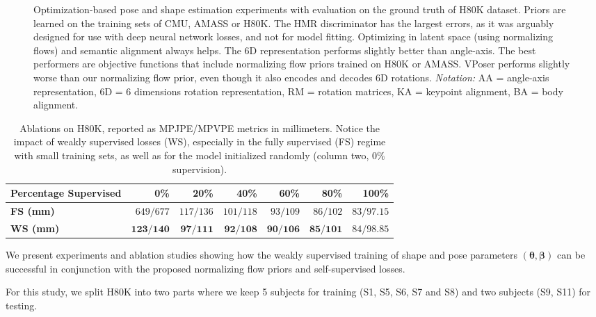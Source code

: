 \documentclass[runningheads]{llncs}
\newcommand{\thetab}{\bm{\theta}}
\newcommand{\betab}{\bm{\beta}}
\begin{document}
\begin{figure}
{\begin{tabular}[t]{|l|r|r|}
    \hline
    \end{tabular}
}
{
\caption{\small Optimization-based pose and shape estimation experiments with evaluation on the ground truth of H80K dataset. Priors are learned on the training sets of CMU, AMASS or H80K. The HMR discriminator has the largest errors, as it was arguably designed for use with deep neural network losses, and not for model fitting. Optimizing in latent space (using normalizing flows) and semantic alignment always helps. The 6D representation performs slightly better than angle-axis. The best performers are objective functions that include normalizing flow priors trained on H80K or AMASS. VPoser performs slightly worse than our normalizing flow prior, even though it also encodes and decodes 6D rotations. \textit{Notation:} AA = angle-axis representation, 6D = 6 dimensions rotation representation, RM = rotation matrices, KA = keypoint alignment, BA = body alignment.}
\label{tbl:fitting_experiment_h80k}
}
\end{figure}

\begin{table*}[!htbp]
    \small
    \centering
    \begin{tabular}[t]{|l|r|r|r|r|r|r|}
    \hline
    \textbf{Percentage Supervised}  & {0\%} & {20\%} & {40\%} & {60\%} & {80\%} & {100\%}  \\ 
    \hline
    \hline
    \textbf{FS (mm)} & $649/677$ & $117/136$ & $101/118$ & $93/109$ & $86/102$ & $83/97.15$\\
    \hline
    \textbf{WS (mm)} & $\mathbf{123/140}$ & $\mathbf{97/111}$ & $\textbf{92/108}$ & $\mathbf{90/106}$ & $\mathbf{85/101}$ & $84/98.85$ \\
    \hline
    \end{tabular}
    \caption{\small Ablations on H80K, reported as MPJPE/MPVPE metrics in millimeters. Notice the impact of weakly supervised losses (WS), especially in the fully supervised (FS) regime with small training sets, as well as for the model initialized randomly (column two, $0\%$ supervision). }
\label{tbl:ablation_fs_ws_h80k}
\end{table*}

We present experiments and ablation studies showing how the weakly supervised training of shape and pose parameters $\left(\thetab, \betab\right)$ can be successful in conjunction with the proposed normalizing flow priors and self-supervised losses.

For this study, we split H80K into two parts where we keep 5 subjects for training (S1, S5, S6, S7 and S8) and two subjects (S9, S11) for testing.
\end{document}

